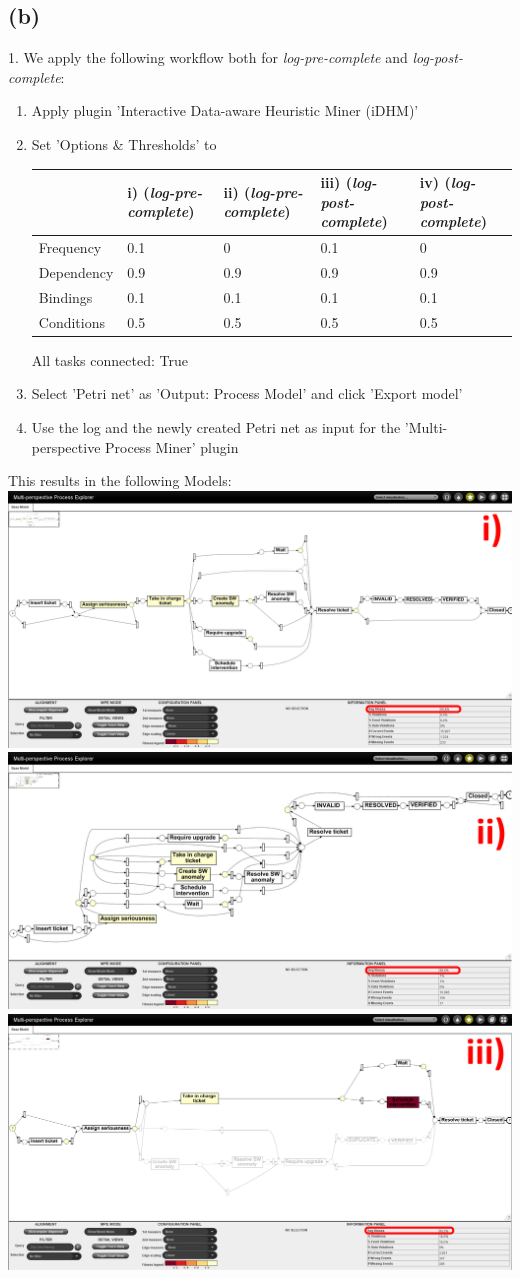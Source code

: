 \documentclass[../../main.tex]{subfiles}
\begin{document}
\subsection*{(b)}
1. We apply the following workflow both for \textit{log-pre-complete} and \textit{log-post-complete}: 
\begin{enumerate}
\item Apply plugin 'Interactive Data-aware Heuristic Miner (iDHM)'
\item Set 'Options \& Thresholds' to\\
\begin{table}[h!]
\begin{tabular}{l|llll}
           & i) (\textit{log-pre-complete}) & ii) (\textit{log-pre-complete}) & iii) (\textit{log-post-complete}) & iv) (\textit{log-post-complete})\\
           \hline
Frequency  & 0.1 & 0   & 0.1  & 0   \\
Dependency & 0.9 & 0.9 & 0.9  & 0.9 \\
Bindings   & 0.1 & 0.1 & 0.1  & 0.1 \\
Conditions & 0.5 & 0.5 & 0.5  & 0.5
\end{tabular}
\end{table}	
All tasks connected: True
\item Select 'Petri net' as 'Output: Process Model' and click 'Export model'
\item Use the log and the newly created Petri net as input for the 'Multi-perspective Process Miner' plugin
\end{enumerate}
This results in the following Models:\\
\includegraphics[width=0.5\columnwidth]{img/ProM_b_1i.png}
\includegraphics[width=0.5\columnwidth]{img/ProM_b_1ii.png}
\includegraphics[width=0.5\columnwidth]{img/ProM_b_1iii.png}
\end{document}
